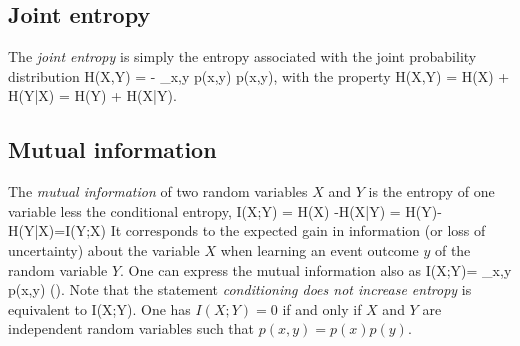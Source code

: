 \subsection{Joint entropy}
\label{subsec:infoJointEntropy}
The \emph{joint entropy} is simply the entropy associated with the joint probability distribution
\be 
H(X,Y) = - \sum_{x,y} p(x,y) \ln p(x,y),
\ee 
with the property
\bse 
H(X,Y) = H(X) + H(Y|X) = H(Y) + H(X|Y).
\ese 

\subsection{Mutual information}
\label{subsec:infoMutualInfo}
The \emph{mutual information} of two random variables $X$ and $Y$ is the entropy of one variable less the conditional entropy,
\be 
\label{eq:infoMutualInfo}
I(X;Y) = H(X) -H(X|Y) = H(Y)-H(Y|X)=I(Y;X)
\ee 
It corresponds to the expected gain in information (or loss of uncertainty) about the variable $X$ when learning an event outcome $y$ of the random variable $Y$. One can express the mutual information also as
\be
I(X;Y)= \sum_{x,y} p(x,y) \ln\left(\right).
\ee 
Note that the statement \emph{conditioning does not increase entropy} is equivalent to
\be 
\label{eq:infoMutualInfoInequality}
I(X;Y).
\ee 
One has $I(X;Y)=0$ if and only if $X$ and $Y$ are independent random variables such that $p(x,y) = p(x)p(y)$.


